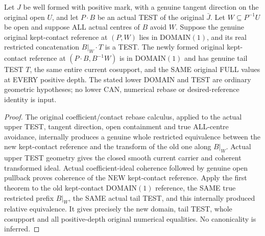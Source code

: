 \begin{theorem}
\label{hir:original-curve-kept-contact-full-rebase}
\leanok
Let $J$ be well formed with positive mark, with a genuine tangent direction
on the original open $U$, and let $P\mathbin{\cdot}B$ be an actual TEST
of the original $\bar J$. Let $W\subseteq P^{-1}U$ be open and suppose
ALL actual centres of $B$ avoid $W$. Suppose the genuine original
kept-contact reference at $(P,W)$ lies in DOMAIN$(1)$, and its real
restricted concatenation $B|_W\mathbin{\cdot}T$ is a TEST. The newly
formed original kept-contact reference at $(P\mathbin{\cdot}B,B^{-1}W)$
is in DOMAIN$(1)$ and has genuine tail TEST $T$, the same entire current
cosupport, and the SAME original FULL values at EVERY positive depth.
The stated lower DOMAIN and TEST are ordinary geometric hypotheses;
no lower CAN, numerical rebase or desired-reference identity is input.
\end{theorem}
\begin{proof}
The original coefficient/contact rebase calculus, applied to the actual
upper TEST, tangent direction, open containment and true ALL-centre
avoidance, internally produces a genuine whole restricted equivalence
between the new kept-contact reference and the transform of the old one
along $B|_W$. Actual upper TEST geometry gives the closed smooth current
carrier and coherent transformed ideal. Actual coefficient-ideal
coherence followed by genuine open pullback proves coherence of the NEW
kept-contact reference. Apply the first theorem to the old kept-contact
DOMAIN$(1)$ reference, the SAME true restricted prefix $B|_W$, the SAME
actual tail TEST, and this internally produced relative equivalence.
It gives precisely the new domain, tail TEST, whole cosupport and all
positive-depth original numerical equalities. No canonicality is inferred.
\end{proof}

